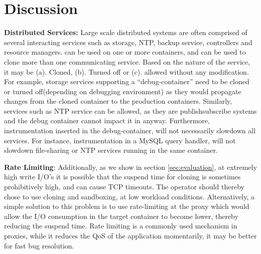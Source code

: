 \section{Discussion}
\label{sec:discussion}

\textbf{Distributed Services:}  
Large scale distributed systems are often comprised of several interacting services such as storage, NTP, backup service, controllers and resource managers.
\parikshan can be used on one or more containers, and can be used to clone more than one communicating service.
Based on the nature of the service, it may be (a). Cloned, (b). Turned off or (c). allowed without any modification.
For example, storage services supporting a ``debug-container'' need to be cloned or turned off(depending on debugging environment) as they would propagate changes from the cloned container to the production containers.
Similarly, services such as NTP service can be allowed, as they are publish\/subscribe systems and the debug container cannot impact it in anyway.
Furthermore, instrumentation inserted in the debug-container, will not necessarily slowdown all services.
For instance, instrumentation in a MySQL query handler, will not slowdown file-sharing or NTP services running in the same container.



\textbf{Rate Limiting}: 
Additionally, as we show in section \ref{sec:evaluation}, at extremely high write I/O's it is possible that the suspend time for cloning is sometimes prohibitively high, and can cause TCP timeouts. 
The operator should thereby chose to use cloning and sandboxing, at low workload conditions. 
Alternatively, a simple solution to this problem is to use rate-limiting at the proxy which would allow the I/O consumption in the target container to become lower, thereby reducing the suspend time.
Rate limiting is a commonly used mechanism in proxies, while it reduces the QoS of the application momentarily, it may be better for fast bug resolution.


